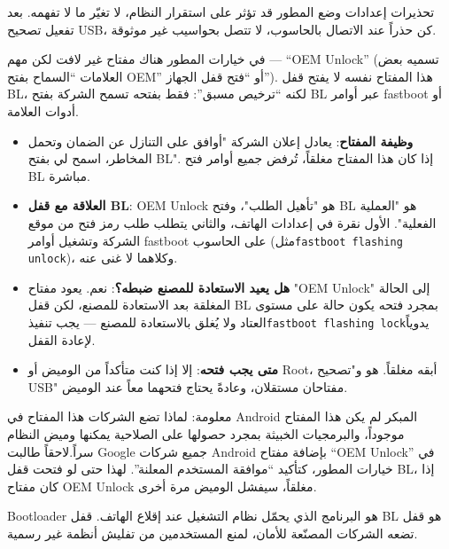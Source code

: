 \begin{tcbwarn}{تحذيرات}
إعدادات وضع المطور قد تؤثر على استقرار النظام، لا تغيّر ما لا تفهمه. بعد تفعيل تصحيح USB، كن حذراً عند الاتصال بالحاسوب، لا تتصل بحواسيب غير موثوقة.

\end{tcbwarn}


في خيارات المطور هناك مفتاح غير لافت لكن مهم — “OEM Unlock” (تسميه بعض العلامات “السماح بفتح OEM” أو “فتح قفل الجهاز”). هذا المفتاح نفسه لا يفتح قفل BL، لكنه “ترخيص مسبق”: فقط بفتحه تسمح الشركة بفتح BL عبر أوامر fastboot أو أدوات العلامة.

\begin{itemize}
  \item \textbf{وظيفة المفتاح}: يعادل إعلان الشركة "أوافق على التنازل عن الضمان وتحمل المخاطر، اسمح لي بفتح BL". إذا كان هذا المفتاح مغلقاً، تُرفض جميع أوامر فتح BL مباشرة.
  \item \textbf{العلاقة مع قفل BL}: OEM Unlock هو "تأهيل الطلب"، وفتح BL هو "العملية الفعلية". الأول نقرة في إعدادات الهاتف، والثاني يتطلب طلب رمز فتح من موقع الشركة وتشغيل أوامر fastboot على الحاسوب (مثل\texttt{fastboot flashing unlock})، وكلاهما لا غنى عنه.
  \item \textbf{هل يعيد الاستعادة للمصنع ضبطه؟}: نعم. يعود مفتاح "OEM Unlock" إلى الحالة المغلقة بعد الاستعادة للمصنع، لكن قفل BL بمجرد فتحه يكون حالة على مستوى العتاد ولا يُغلق بالاستعادة للمصنع — يجب تنفيذ\texttt{fastboot flashing lock}يدوياً لإعادة القفل.
  \item \textbf{متى يجب فتحه}: إلا إذا كنت متأكداً من الوميض أو Root، أبقه مغلقاً. هو و"تصحيح USB" مفتاحان مستقلان، وعادةً يحتاج فتحهما معاً عند الوميض.
\end{itemize}

\begin{tcbinfo}{معلومة: لماذا تضع الشركات هذا المفتاح}
في Android المبكر لم يكن هذا المفتاح موجوداً، والبرمجيات الخبيثة بمجرد حصولها على الصلاحية يمكنها وميض النظام سراً.لاحقاً طالبت Google جميع شركات Android بإضافة مفتاح “OEM Unlock” في خيارات المطور، كتأكيد “موافقة المستخدم المعلنة”. لهذا حتى لو فتحت قفل BL، إذا كان مفتاح OEM Unlock مغلقاً، سيفشل الوميض مرة أخرى.

\end{tcbinfo}


Bootloader هو البرنامج الذي يحمّل نظام التشغيل عند إقلاع الهاتف. قفل BL هو قفل تضعه الشركات المصنّعة للأمان، لمنع المستخدمين من تفليش أنظمة غير رسمية.

